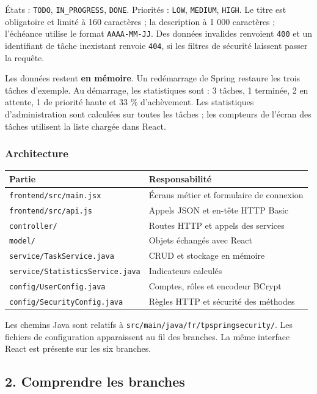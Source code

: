 \documentclass[
  french,
  10pt,
  a4paper,
]{article}
\newcounter{none} %
\begin{document}
États : \texttt{TODO}, \texttt{IN\_PROGRESS}, \texttt{DONE}. Priorités :
\texttt{LOW}, \texttt{MEDIUM}, \texttt{HIGH}. Le titre est obligatoire
et limité à 160 caractères ; la description à 1 000 caractères ;
l'échéance utilise le format \texttt{AAAA-MM-JJ}. Des données invalides
renvoient \texttt{400} et un identifiant de tâche inexistant renvoie
\texttt{404}, si les filtres de sécurité laissent passer la requête.

Les données restent \textbf{en mémoire}. Un redémarrage de Spring
restaure les trois tâches d'exemple. Au démarrage, les statistiques sont
: 3 tâches, 1 terminée, 2 en attente, 1 de priorité haute et 33 \%
d'achèvement. Les statistiques d'administration sont calculées sur
toutes les tâches ; les compteurs de l'écran des tâches utilisent la
liste chargée dans React.

\subsubsection{Architecture}\label{architecture}

{\def\LTcaptype{none} %
\begin{longtable}[]{@{}ll@{}}
\toprule\noalign{}
Partie & Responsabilité \\
\midrule\noalign{}
\endhead
\bottomrule\noalign{}
\endlastfoot
\texttt{frontend/src/main.jsx} & Écrans métier et formulaire de
connexion \\
\texttt{frontend/src/api.js} & Appels JSON et en-tête HTTP Basic \\
\texttt{controller/} & Routes HTTP et appels des services \\
\texttt{model/} & Objets échangés avec React \\
\texttt{service/TaskService.java} & CRUD et stockage en mémoire \\
\texttt{service/StatisticsService.java} & Indicateurs calculés \\
\texttt{config/UserConfig.java} & Comptes, rôles et encodeur BCrypt \\
\texttt{config/SecurityConfig.java} & Règles HTTP et sécurité des
méthodes \\
\end{longtable}
}

Les chemins Java sont relatifs à
\texttt{src/main/java/fr/tpspringsecurity/}. Les fichiers de
configuration apparaissent au fil des branches. La même interface React
est présente sur les six branches.

\subsection{2. Comprendre les branches}\label{comprendre-les-branches}
\end{document}
